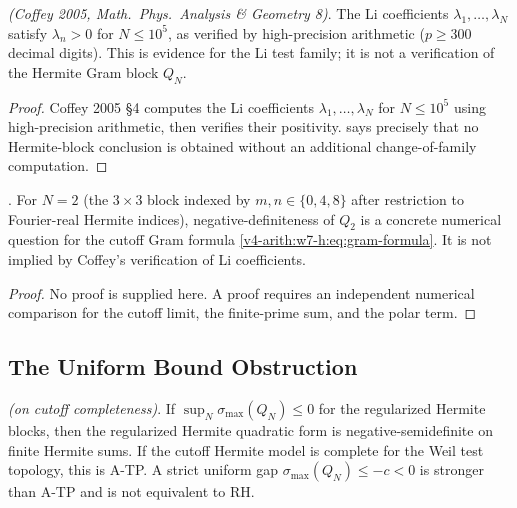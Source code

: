 \begin{theorem}
\label{v4-arith:w7-h:thm:coffey}
\ClaimStatusProvedElsewhere \emph{(Coffey 2005,
\emph{Math.~Phys.~Analysis \& Geometry} 8)}. The Li coefficients
\(\lambda_{1},\ldots,\lambda_{N}\) satisfy \(\lambda_{n}>0\) for
\(N\leq 10^{5}\), as verified by high-precision arithmetic
(\(p\geq 300\) decimal digits). This is evidence for the Li test
family; it is not a verification of the Hermite Gram block \(Q_N\).
\end{theorem}

\begin{proof}
Coffey 2005 \S4 computes the Li coefficients \(\lambda_{1},\ldots,\lambda_{N}\)
for \(N\leq 10^{5}\) using high-precision arithmetic, then verifies
their positivity.  says precisely
that no Hermite-block conclusion is obtained without an additional
change-of-family computation.
\end{proof}

\begin{proposition}
\label{v4-arith:w7-h:prop:small-N}
\ClaimStatusNeedsVerification. For \(N=2\) (the \(3\times 3\) block indexed by
\(m,n\in\{0,4,8\}\) after restriction to Fourier-real Hermite indices),
negative-definiteness of \(Q_{2}\) is a concrete numerical question
for the cutoff Gram formula \eqref{v4-arith:w7-h:eq:gram-formula}. It
is not implied by Coffey's verification of Li coefficients.
\end{proposition}

\begin{proof}
No proof is supplied here. A proof requires an independent numerical
comparison for the cutoff limit, the finite-prime sum, and the polar term.
\end{proof}

\subsection{The Uniform Bound Obstruction}
\label{v4-arith:w7-h:finite-N:uniform}

\begin{theorem}
\label{v4-arith:w7-h:thm:uniform}
\ClaimStatusProvedHereConditional \emph{(on cutoff completeness)}.
If \(\sup_{N}\sigma_{\max}(Q_{N})\leq0\) for the regularized Hermite
blocks, then the regularized Hermite quadratic form is
negative-semidefinite on finite Hermite sums. If the cutoff Hermite
model is complete for the Weil test topology, this is A-TP. A strict
uniform gap \(\sigma_{\max}(Q_N)\leq-c<0\) is stronger than A-TP and is
not equivalent to RH.
\end{theorem}

